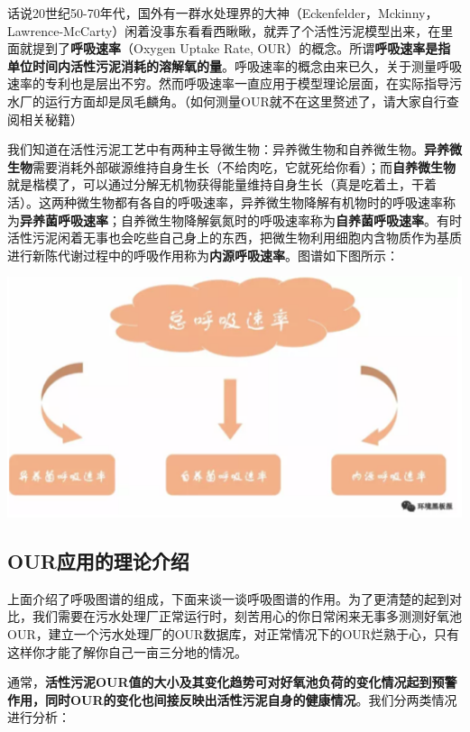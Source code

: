 \documentclass[
]{book}
\begin{document}
话说20世纪50-70年代，国外有一群水处理界的大神（Eckenfelder，Mckinny，Lawrence-McCarty）闲着没事东看看西瞅瞅，就弄了个活性污泥模型出来，在里面就提到了\textbf{呼吸速率}（Oxygen Uptake Rate, OUR）的概念。所谓\textbf{呼吸速率是指单位时间内活性污泥消耗的溶解氧的量}。呼吸速率的概念由来已久，关于测量呼吸速率的专利也是层出不穷。然而呼吸速率一直应用于模型理论层面，在实际指导污水厂的运行方面却是凤毛麟角。（如何测量OUR就不在这里赘述了，请大家自行查阅相关秘籍）

我们知道在活性污泥工艺中有两种主导微生物：异养微生物和自养微生物。\textbf{异养微生物}需要消耗外部碳源维持自身生长（不给肉吃，它就死给你看）；而\textbf{自养微生物}就是楷模了，可以通过分解无机物获得能量维持自身生长（真是吃着土，干着活）。这两种微生物都有各自的呼吸速率，异养微生物降解有机物时的呼吸速率称为\textbf{异养菌呼吸速率}；自养微生物降解氨氮时的呼吸速率称为\textbf{自养菌呼吸速率}。有时活性污泥闲着无事也会吃些自己身上的东西，把微生物利用细胞内含物质作为基质进行新陈代谢过程中的呼吸作用称为\textbf{内源呼吸速率}。图谱如下图所示：

\includegraphics[width=6.67in]{images/os2}

\hypertarget{ourux5e94ux7528ux7684ux7406ux8bbaux4ecbux7ecd}{%
\subsection{OUR应用的理论介绍}\label{ourux5e94ux7528ux7684ux7406ux8bbaux4ecbux7ecd}}

上面介绍了呼吸图谱的组成，下面来谈一谈呼吸图谱的作用。为了更清楚的起到对比，我们需要在污水处理厂正常运行时，刻苦用心的你日常闲来无事多测测好氧池OUR，建立一个污水处理厂的OUR数据库，对正常情况下的OUR烂熟于心，只有这样你才能了解你自己一亩三分地的情况。

通常，\textbf{活性污泥OUR值的大小及其变化趋势可对好氧池负荷的变化情况起到预警作用，同时OUR的变化也间接反映出活性污泥自身的健康情况}。我们分两类情况进行分析：
\end{document}

